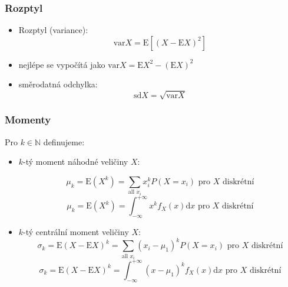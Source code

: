 \subsubsection*{Rozptyl}
\begin{itemize}
	\item Rozptyl (variance): $$\text{var}X = \text{E}[(X-\text{E}X)^2]$$
	\item nejlépe se vypočítá jako $\text{var}X = \text{E}X^2 - (\text{E}X)^2$
	\item směrodatná odchylka: $$\text{sd}X = \sqrt{\text{var}X}$$
\end{itemize}

\subsubsection*{Momenty}
Pro $k \in \mathbb{N}$ definujeme:
\begin{itemize}
	\item $k$-tý moment náhodné veličiny $X$:
	
	$$\mu_k = \text{E}(X^k) = \sum_{\text{all }x_i} x_i^k P(X = x_i) \text{ pro } X \text{ diskrétní}$$
	$$\mu_k = \text{E}(X^k) = \int_{-\infty}^{+\infty} x^k f_X(x)\text{d}x \text{ pro } X \text{ diskrétní}$$
	\item $k$-tý centrální moment veličiny $X$:
	$$\sigma_k = \text{E}(X-\text{E}X)^k = \sum_{\text{all }x_i} (x_i - \mu_1)^k P(X = x_i) \text{ pro } X \text{ diskrétní}$$
	$$\sigma_k = \text{E}(X-\text{E}X)^k = \int_{-\infty}^{+\infty} (x - \mu_1)^k f_X(x)\text{d}x \text{ pro } X \text{ diskrétní}$$
\end{itemize}

